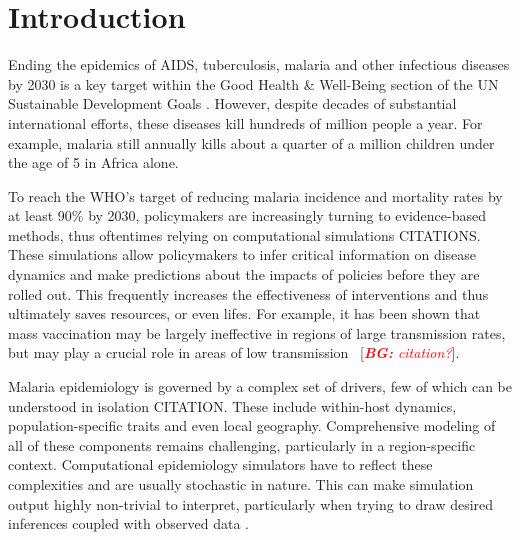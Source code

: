 \documentclass{article}
\newcommand{\bg}[1]{~{{[{\it \textcolor{red}{{\bf BG:} #1}}]}}}
\begin{document}
\section{Introduction}
Ending the epidemics of AIDS, tuberculosis, malaria and other infectious diseases by 2030 is a key target within the Good Health \& Well-Being section of the UN Sustainable Development Goals \cite{refugees_2030_nodate,un_sustainable_2018}. 
However, despite decades of substantial international efforts, these diseases kill hundreds of million people a year.
For example, malaria still annually kills about a quarter of a million children under the age of 5 in Africa alone.



To reach the WHO’s target of reducing malaria incidence and mortality rates by at least 90\% by 2030, policymakers are increasingly turning to evidence-based methods, thus oftentimes relying on computational simulations CITATIONS. 
These simulations allow policymakers to infer critical information on disease dynamics and make predictions about the impacts of policies
before they are rolled out. This frequently increases the effectiveness of interventions and thus ultimately saves resources, or even lifes.
For example, it has been shown that mass vaccination may be largely ineffective in regions of large transmission rates, but may play a crucial role in areas of low transmission \bg{citation?}. 

Malaria epidemiology is governed by a complex set of drivers, 
few of which can be understood in isolation CITATION.
These include within-host dynamics, population-specific traits and even local geography.
Comprehensive modeling of all of these components remains challenging, particularly in a region-specific context. 
Computational epidemiology simulators have to reflect these complexities and are usually stochastic in nature. This can make simulation output highly non-trivial to interpret, particularly when trying to draw desired inferences coupled with observed data \cite{TODO}.
\end{document}
